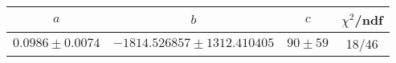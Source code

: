 \begin{tabular}{c|c|c|c}
$a$ & $b$ & $c$ & $\chi^2$/ndf \\
\hline
$0.0986\pm0.0074$ & $-1814.526857\pm1312.410405$ & $90\pm59$ & 18/46
\end{tabular}
